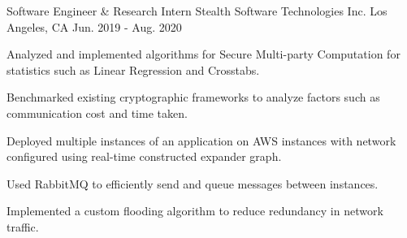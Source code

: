 \begin{cventries}
  \resumeentry
    {Software Engineer \& Research Intern} %
    {Stealth Software Technologies Inc.} %
    {Los Angeles, CA} %
    {Jun. 2019 - Aug. 2020} %
    {
      \begin{cvitems} %
        \item{Analyzed and implemented algorithms for Secure Multi-party Computation for statistics such as Linear Regression and Crosstabs.}
        \item{Benchmarked existing cryptographic frameworks to analyze factors such as communication cost and time taken.}
        \item{Deployed multiple instances of an application on AWS instances with network configured using real-time constructed expander graph.}
        \item{Used RabbitMQ to efficiently send and queue messages between instances.}
        \item{Implemented a custom flooding algorithm to reduce redundancy in network traffic.} 
      \end{cvitems}
    }
\end{cventries}

